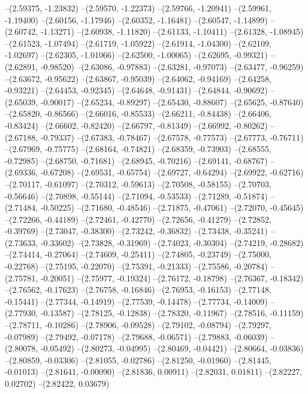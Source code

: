 --(2.59375, -1.23832)
--(2.59570, -1.22373)
--(2.59766, -1.20941)
--(2.59961, -1.19400)
--(2.60156, -1.17946)
--(2.60352, -1.16481)
--(2.60547, -1.14899)
--(2.60742, -1.13271)
--(2.60938, -1.11820)
--(2.61133, -1.10411)
--(2.61328, -1.08945)
--(2.61523, -1.07494)
--(2.61719, -1.05922)
--(2.61914, -1.04300)
--(2.62109, -1.02697)
--(2.62305, -1.01066)
--(2.62500, -1.00065)
--(2.62695, -0.99321)
--(2.62891, -0.98520)
--(2.63086, -0.97883)
--(2.63281, -0.97073)
--(2.63477, -0.96259)
--(2.63672, -0.95622)
--(2.63867, -0.95039)
--(2.64062, -0.94169)
--(2.64258, -0.93221)
--(2.64453, -0.92345)
--(2.64648, -0.91431)
--(2.64844, -0.90692)
--(2.65039, -0.90017)
--(2.65234, -0.89297)
--(2.65430, -0.88607)
--(2.65625, -0.87640)
--(2.65820, -0.86566)
--(2.66016, -0.85533)
--(2.66211, -0.84438)
--(2.66406, -0.83424)
--(2.66602, -0.82420)
--(2.66797, -0.81349)
--(2.66992, -0.80262)
--(2.67188, -0.79337)
--(2.67383, -0.78467)
--(2.67578, -0.77573)
--(2.67773, -0.76711)
--(2.67969, -0.75775)
--(2.68164, -0.74821)
--(2.68359, -0.73903)
--(2.68555, -0.72985)
--(2.68750, -0.71681)
--(2.68945, -0.70216)
--(2.69141, -0.68767)
--(2.69336, -0.67208)
--(2.69531, -0.65754)
--(2.69727, -0.64294)
--(2.69922, -0.62716)
--(2.70117, -0.61097)
--(2.70312, -0.59613)
--(2.70508, -0.58155)
--(2.70703, -0.56646)
--(2.70898, -0.55144)
--(2.71094, -0.53533)
--(2.71289, -0.51874)
--(2.71484, -0.50225)
--(2.71680, -0.48546)
--(2.71875, -0.47061)
--(2.72070, -0.45645)
--(2.72266, -0.44189)
--(2.72461, -0.42770)
--(2.72656, -0.41279)
--(2.72852, -0.39769)
--(2.73047, -0.38300)
--(2.73242, -0.36832)
--(2.73438, -0.35241)
--(2.73633, -0.33602)
--(2.73828, -0.31969)
--(2.74023, -0.30304)
--(2.74219, -0.28682)
--(2.74414, -0.27064)
--(2.74609, -0.25411)
--(2.74805, -0.23749)
--(2.75000, -0.22768)
--(2.75195, -0.22070)
--(2.75391, -0.21333)
--(2.75586, -0.20784)
--(2.75781, -0.20051)
--(2.75977, -0.19324)
--(2.76172, -0.18798)
--(2.76367, -0.18342)
--(2.76562, -0.17623)
--(2.76758, -0.16846)
--(2.76953, -0.16153)
--(2.77148, -0.15441)
--(2.77344, -0.14919)
--(2.77539, -0.14478)
--(2.77734, -0.14009)
--(2.77930, -0.13587)
--(2.78125, -0.12838)
--(2.78320, -0.11967)
--(2.78516, -0.11159)
--(2.78711, -0.10286)
--(2.78906, -0.09528)
--(2.79102, -0.08794)
--(2.79297, -0.07989)
--(2.79492, -0.07178)
--(2.79688, -0.06571)
--(2.79883, -0.06039)
--(2.80078, -0.05492)
--(2.80273, -0.04995)
--(2.80469, -0.04421)
--(2.80664, -0.03836)
--(2.80859, -0.03306)
--(2.81055, -0.02786)
--(2.81250, -0.01960)
--(2.81445, -0.01013)
--(2.81641, -0.00090)
--(2.81836, 0.00911)
--(2.82031, 0.01811)
--(2.82227, 0.02702)
--(2.82422, 0.03679)

